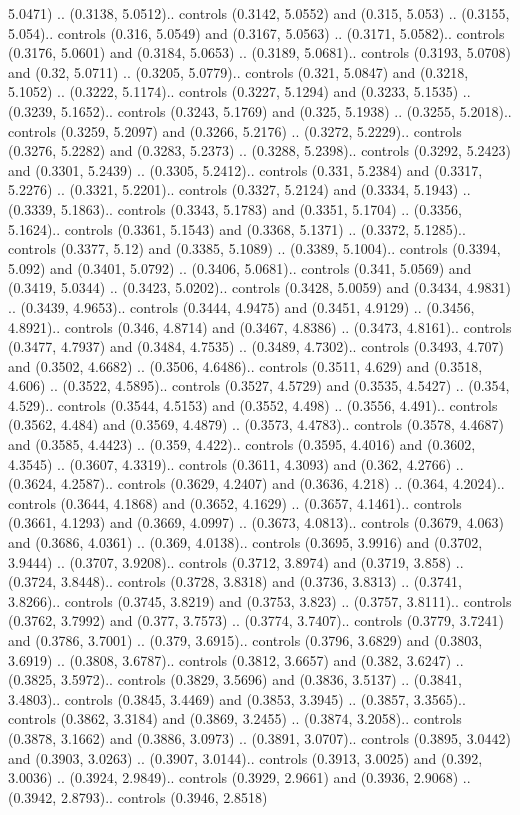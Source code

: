 5.0471) .. (0.3138, 5.0512).. controls (0.3142, 5.0552) and (0.315, 5.053) .. (0.3155, 5.054).. controls (0.316, 5.0549) and (0.3167, 5.0563) .. (0.3171, 5.0582).. controls (0.3176, 5.0601) and (0.3184, 5.0653) .. (0.3189, 5.0681).. controls (0.3193, 5.0708) and (0.32, 5.0711) .. (0.3205, 5.0779).. controls (0.321, 5.0847) and (0.3218, 5.1052) .. (0.3222, 5.1174).. controls (0.3227, 5.1294) and (0.3233, 5.1535) .. (0.3239, 5.1652).. controls (0.3243, 5.1769) and (0.325, 5.1938) .. (0.3255, 5.2018).. controls (0.3259, 5.2097) and (0.3266, 5.2176) .. (0.3272, 5.2229).. controls (0.3276, 5.2282) and (0.3283, 5.2373) .. (0.3288, 5.2398).. controls (0.3292, 5.2423) and (0.3301, 5.2439) .. (0.3305, 5.2412).. controls (0.331, 5.2384) and (0.3317, 5.2276) .. (0.3321, 5.2201).. controls (0.3327, 5.2124) and (0.3334, 5.1943) .. (0.3339, 5.1863).. controls (0.3343, 5.1783) and (0.3351, 5.1704) .. (0.3356, 5.1624).. controls (0.3361, 5.1543) and (0.3368, 5.1371) .. (0.3372, 5.1285).. controls (0.3377, 5.12) and (0.3385, 5.1089) .. (0.3389, 5.1004).. controls (0.3394, 5.092) and (0.3401, 5.0792) .. (0.3406, 5.0681).. controls (0.341, 5.0569) and (0.3419, 5.0344) .. (0.3423, 5.0202).. controls (0.3428, 5.0059) and (0.3434, 4.9831) .. (0.3439, 4.9653).. controls (0.3444, 4.9475) and (0.3451, 4.9129) .. (0.3456, 4.8921).. controls (0.346, 4.8714) and (0.3467, 4.8386) .. (0.3473, 4.8161).. controls (0.3477, 4.7937) and (0.3484, 4.7535) .. (0.3489, 4.7302).. controls (0.3493, 4.707) and (0.3502, 4.6682) .. (0.3506, 4.6486).. controls (0.3511, 4.629) and (0.3518, 4.606) .. (0.3522, 4.5895).. controls (0.3527, 4.5729) and (0.3535, 4.5427) .. (0.354, 4.529).. controls (0.3544, 4.5153) and (0.3552, 4.498) .. (0.3556, 4.491).. controls (0.3562, 4.484) and (0.3569, 4.4879) .. (0.3573, 4.4783).. controls (0.3578, 4.4687) and (0.3585, 4.4423) .. (0.359, 4.422).. controls (0.3595, 4.4016) and (0.3602, 4.3545) .. (0.3607, 4.3319).. controls (0.3611, 4.3093) and (0.362, 4.2766) .. (0.3624, 4.2587).. controls (0.3629, 4.2407) and (0.3636, 4.218) .. (0.364, 4.2024).. controls (0.3644, 4.1868) and (0.3652, 4.1629) .. (0.3657, 4.1461).. controls (0.3661, 4.1293) and (0.3669, 4.0997) .. (0.3673, 4.0813).. controls (0.3679, 4.063) and (0.3686, 4.0361) .. (0.369, 4.0138).. controls (0.3695, 3.9916) and (0.3702, 3.9444) .. (0.3707, 3.9208).. controls (0.3712, 3.8974) and (0.3719, 3.858) .. (0.3724, 3.8448).. controls (0.3728, 3.8318) and (0.3736, 3.8313) .. (0.3741, 3.8266).. controls (0.3745, 3.8219) and (0.3753, 3.823) .. (0.3757, 3.8111).. controls (0.3762, 3.7992) and (0.377, 3.7573) .. (0.3774, 3.7407).. controls (0.3779, 3.7241) and (0.3786, 3.7001) .. (0.379, 3.6915).. controls (0.3796, 3.6829) and (0.3803, 3.6919) .. (0.3808, 3.6787).. controls (0.3812, 3.6657) and (0.382, 3.6247) .. (0.3825, 3.5972).. controls (0.3829, 3.5696) and (0.3836, 3.5137) .. (0.3841, 3.4803).. controls (0.3845, 3.4469) and (0.3853, 3.3945) .. (0.3857, 3.3565).. controls (0.3862, 3.3184) and (0.3869, 3.2455) .. (0.3874, 3.2058).. controls (0.3878, 3.1662) and (0.3886, 3.0973) .. (0.3891, 3.0707).. controls (0.3895, 3.0442) and (0.3903, 3.0263) .. (0.3907, 3.0144).. controls (0.3913, 3.0025) and (0.392, 3.0036) .. (0.3924, 2.9849).. controls (0.3929, 2.9661) and (0.3936, 2.9068) .. (0.3942, 2.8793).. controls (0.3946, 2.8518) 